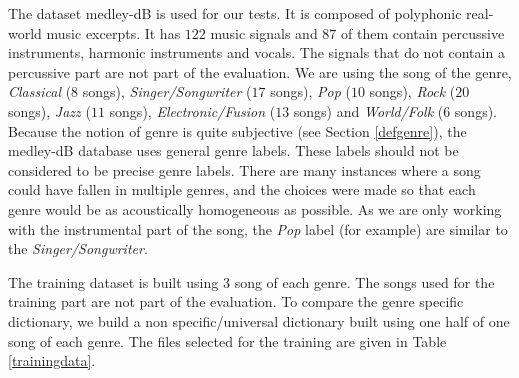 \documentclass{article}
\begin{document}
The dataset medley-dB \cite{bittner2014medleydb} is used for our tests. It is composed of polyphonic real-world music excerpts. It has $122$ music signals and $87$ of them contain percussive instruments, harmonic instruments and vocals. The signals that do not contain a percussive part are not part of the evaluation. We are using the song of the genre, \emph{Classical} ($8$ songs), \emph{Singer/Songwriter} ($17$ songs), \emph{Pop} ($10$ songs), \emph{Rock} ($20$ songs), \emph{Jazz} ($11$ songs), \emph{Electronic/Fusion} ($13$ songs) and \emph{World/Folk} ($6$ songs). Because the notion of genre is quite subjective (see Section \ref{defgenre}), the medley-dB database uses general genre labels. These labels should not be considered to be precise genre labels. There are many instances where a song could have fallen in multiple genres, and the choices were made so that each genre would be as acoustically homogeneous as possible. As we are only working with the instrumental part of the song, the \emph{Pop} label (for example) are similar to the \emph{Singer/Songwriter}.

The training dataset is built using $3$ song of each genre. The songs used for the training part are not part of the evaluation. To compare the genre specific dictionary, we build a non specific/universal dictionary built using one half of one song of each genre. The files selected for the training are given in Table \ref{trainingdata}. 
\end{document}
